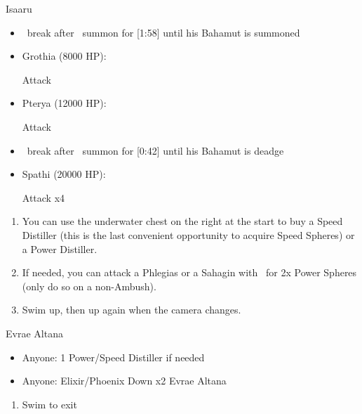 \begin{battle}{Isaaru}
    \begin{itemize}
        \item \turbo\ break after \bahamut\ summon for [1:58] until his Bahamut is summoned
        \item Grothia (8000 HP):
        \begin{itemize}
            \summon{\bahamut}
            \bahamutf Attack
        \end{itemize}
        \item Pterya (12000 HP):
        \begin{itemize}
            \summon{\bahamut}
            \bahamutf Attack
        \end{itemize}
        \item \turbo\ break after \ixion\ summon for [0:42] until his Bahamut is deadge
        \item Spathi (20000 HP):
        \begin{itemize}
            \summon{\ixion}
            \ixionf Attack x4
        \end{itemize}
    \end{itemize}
\end{battle}
\begin{enumerate}[resume]
    \item You can use the underwater chest on the right at the start to buy a Speed Distiller (this is the last convenient opportunity to acquire Speed Spheres) or a Power Distiller.
    \item If needed, you can attack a Phlegias or a Sahagin with \tidus\ for 2x Power Spheres (only do so on a non-Ambush).
    \item Swim up, then up again when the camera changes.
\end{enumerate}
\begin{battle}{Evrae Altana}
    \begin{itemize}
        \item Anyone: 1 Power/Speed Distiller if needed
        \item Anyone: Elixir/Phoenix Down x2 Evrae Altana
    \end{itemize}
\end{battle}
\begin{enumerate}[resume]
    \item Swim to exit
\end{enumerate}
\bothnp\bothnpsingle
